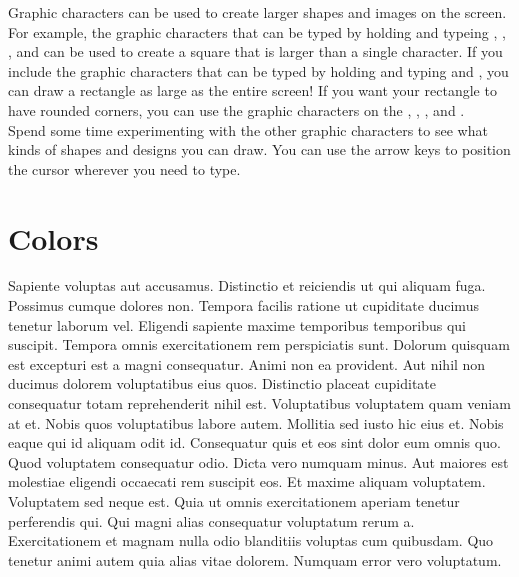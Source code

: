 Graphic characters can be used to create larger shapes and images on the
screen.  For example, the graphic characters that can be typed by holding
\altkey and typeing , , , and  can be used to
create a square that is larger than a single character.  If you include the
graphic characters that can be typed by holding \shiftkey and typing 
and , you can draw a rectangle as large as the entire screen!  If you
want your rectangle to have rounded corners, you can use the graphic characters
on the , , , and .\\

Spend some time experimenting with the other graphic characters to see what
kinds of shapes and designs you can draw.  You can use the arrow keys to
position the cursor wherever you need to type.\\

% 
% 


\chapter*{Colors}

Sapiente voluptas aut accusamus. Distinctio et reiciendis ut qui aliquam fuga.
Possimus cumque dolores non. Tempora facilis ratione ut cupiditate ducimus
tenetur laborum vel. Eligendi sapiente maxime temporibus temporibus qui
suscipit. Tempora omnis exercitationem rem perspiciatis sunt. Dolorum quisquam
est excepturi est a magni consequatur. Animi non ea provident. Aut nihil non
ducimus dolorem voluptatibus eius quos. Distinctio placeat cupiditate
consequatur totam reprehenderit nihil est. Voluptatibus voluptatem quam veniam
at et. Nobis quos voluptatibus labore autem. Mollitia sed iusto hic eius et.
Nobis eaque qui id aliquam odit id. Consequatur quis et eos sint dolor eum
omnis quo. Quod voluptatem consequatur odio. Dicta vero numquam minus. Aut
maiores est molestiae eligendi occaecati rem suscipit eos. Et maxime aliquam
voluptatem. Voluptatem sed neque est. Quia ut omnis exercitationem aperiam
tenetur perferendis qui. Qui magni alias consequatur voluptatum rerum a.
Exercitationem et magnam nulla odio blanditiis voluptas cum quibusdam. Quo
tenetur animi autem quia alias vitae dolorem. Numquam error vero voluptatum.

